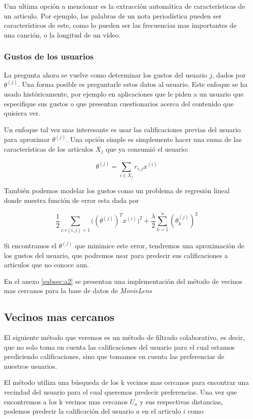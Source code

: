 \documentclass[11pt]{article}
\begin{document}
Una ultima opción a mencionar es la extracción automática de características de
un articulo. Por ejemplo, las palabras de un nota periodística pueden ser
característicos de este, como lo pueden ser las frecuencias mas importantes de
una canción, o la longitud de un vídeo.

\subsubsection{Gustos de los usuarios}

La pregunta ahora se vuelve como determinar los gustos del usuario $j$, dados
por $\theta^{(j)}$. Una forma posible es preguntarle estos datos al usuario.
Este enfoque se ha usado históricamente, por ejemplo en aplicaciones que le
piden a un usuario que especifique sus gustos o que presentan cuestionarios
acerca del contenido que quisiera ver.

Un enfoque tal vez mas interesante es usar las calificaciones previas del
usuario para aproximar $\theta^{(j)}$. Una opción simple es simplemente hacer
una suma de las características de los artículos $X_j$ que ya consumió el
usuario:

$$\theta^{(j)} = \sum_{i\in X_j}r_{i, j}x^{(i)}$$

También podemos modelar los gustos como un problema de regresión lineal donde
nuestra función de error esta dada por

$$\frac{1}{2}\sum_{i:r(i, j)=1} {\Big((\theta^{(j)})^Tx^{(i)}\Big)^2} +
\frac{\lambda}{2}\sum_{k=1}^n {(\theta^{(j)}_k)^2}$$

Si encontramos el $\theta^{(j)}$ que minimice este error, tendremos una
aproximación de los gustos del usuario, que podremos usar para predecir sus
calificaciones a artículos que no conoce aun.

En el anexo \ref{subsec:a2} se presentan una implementación del método de
vecinos mas cercanos para la base de datos de \emph{MovieLens}


\subsection{Vecinos mas cercanos}

El siguiente método que veremos es un método de filtrado colaborativo, es decir,
que no solo toma en cuenta las calificaciones del usuario para el cual estamos
prediciendo calificaciones, sino que tomamos en cuenta las preferencias de
nuestros usuarios.

El método utiliza una búsqueda de los k vecinos mas cercanos para encontrar una
vecindad del usuario para el cual queremos predecir preferencias. Una vez que
encontremos a los k vecinos mas cercanos $U_a$ y sus respectivas distancias,
podemos predecir la calificación del usuario $a$ en el articulo $i$ como
\end{document}

